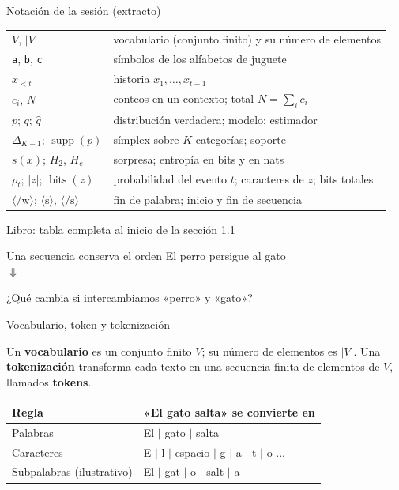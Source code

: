 \documentclass[aspectratio=169,10pt]{beamer}
\newcommand{\libro}[1]{{\scriptsize\color{gray}Libro: #1}}
\begin{document}
\begin{frame}{Notación de la sesión (extracto)}
\small
\begin{tabularx}{\textwidth}{@{}p{38mm}X@{}}\toprule
$V$, $|V|$ & vocabulario (conjunto finito) y su número de elementos\\
\texttt{a}, \texttt{b}, \texttt{c} & símbolos de los alfabetos de juguete\\
$x_{<t}$ & historia $x_1,\ldots,x_{t-1}$\\
$c_i$, $N$ & conteos en un contexto; total $N=\sum_ic_i$\\
$p$; $q$; $\widehat q$ & distribución verdadera; modelo; estimador\\
$\Delta_{K-1}$; $\operatorname{supp}(p)$ & símplex sobre $K$ categorías; soporte\\
$s(x)$; $H_2$, $H_e$ & sorpresa; entropía en bits y en nats\\
$\rho_t$; $|z|$; $\operatorname{bits}(z)$ & probabilidad del evento $t$; caracteres de $z$; bits totales\\
$\langle/\mathrm w\rangle$; $\langle\mathrm s\rangle$, $\langle/\mathrm s\rangle$ & fin de palabra; inicio y fin de secuencia\\\bottomrule
\end{tabularx}
\libro{tabla completa al inicio de la sección 1.1}
\end{frame}

\begin{frame}{Una secuencia conserva el orden}
\centering
\Large El perro persigue al gato\\[4mm]
$\Downarrow$\\[4mm]
\vspace{6mm}\small ¿Qué cambia si intercambiamos «perro» y «gato»?
\end{frame}

\begin{frame}{Vocabulario, token y tokenización}
\begin{definition}
Un \textbf{vocabulario} es un conjunto finito $V$; su número de elementos es $|V|$.
Una \textbf{tokenización} transforma cada texto en una secuencia finita de
elementos de $V$, llamados \textbf{tokens}.
\end{definition}
\begin{center}\begin{tabular}{ll}\toprule
Regla & «El gato salta» se convierte en \\\midrule
Palabras & El $\mid$ gato $\mid$ salta\\
Caracteres & E $\mid$ l $\mid$ espacio $\mid$ g $\mid$ a $\mid$ t $\mid$ o ...\\
Subpalabras (ilustrativo) & El $\mid$ gat $\mid$ o $\mid$ salt $\mid$ a\\\bottomrule
\end{tabular}\end{center}
\end{frame}
\end{document}
